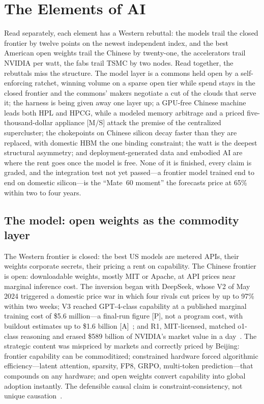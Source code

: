 \chapter{The Elements of AI}
\label{c:elements}

\begin{glance}
Read separately, each element has a Western rebuttal: the models trail the closed frontier by twelve points on the newest independent index, and the best American open weights trail the Chinese by twenty-one, the accelerators trail NVIDIA per watt, the fabs trail TSMC by two nodes. Read together, the rebuttals miss the structure. The model layer is a commons held open by a self-enforcing ratchet, winning volume on a sparse open tier while spend stays in the closed frontier and the commons' makers negotiate a cut of the clouds that serve it; the harness is being given away one layer up; a GPU-free Chinese machine leads both HPL and HPCG, while a modeled memory arbitrage and a priced five-thousand-dollar appliance [M/S] attack the premise of the centralized supercluster; the chokepoints on Chinese silicon decay faster than they are replaced, with domestic HBM the one binding constraint; the watt is the deepest structural asymmetry; and deployment-generated data and embodied AI are where the rent goes once the model is free. None of it is finished, every claim is graded, and the integration test not yet passed---a frontier model trained end to end on domestic silicon---is the ``Mate~60 moment'' the forecasts price at 65\% within two to four years.
\end{glance}

\section{The model: open weights as the commodity layer}
\label{c:model}

The Western frontier is closed: the best US models are metered APIs, their weights corporate secrets, their pricing a rent on capability. The Chinese frontier is open: downloadable weights, mostly MIT or Apache, at API prices near marginal inference cost. The inversion began with DeepSeek, whose V2 of May 2024 triggered a domestic price war in which four rivals cut prices by up to 97\% within two weeks; V3 reached GPT-4-class capability at a published marginal training cost of \$5.6 million---a final-run figure [P], not a program cost, with buildout estimates up to \$1.6 billion [A]~\cite{deepseek-v3}; and R1, MIT-licensed, matched o1-class reasoning and erased \$589 billion of NVIDIA's market value in a day~\cite{r1-shock}. The strategic content was mispriced by markets and correctly priced by Beijing: frontier capability can be commoditized; constrained hardware forced algorithmic efficiency---latent attention, sparsity, FP8, GRPO, multi-token prediction---that compounds on any hardware; and open weights convert capability into global adoption instantly. The defensible causal claim is constraint-consistency, not unique causation~.

